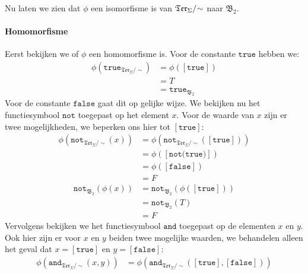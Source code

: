 \documentclass[a4paper,11pt]{article}
\begin{document}
\begin{description}
Nu laten we zien dat $\phi$ een isomorfisme is van
$\mathfrak{Ter}_{\Sigma}/\negmedspace\sim$ naar $\mathfrak{B}_{2}$.

\paragraph{Homomorfisme}

Eerst bekijken we of $\phi$ een homomorfisme is. Voor de constante
$\texttt{true}$ hebben we:
\begin{align*}
\phi(\texttt{true}_{\mathfrak{Ter}_{\Sigma}/\sim}) &= \phi([\texttt{true}]) \\
                                                   &= T \\
                                                   &= \texttt{true}_{\mathfrak{B}_{2}}
\end{align*}
Voor de constante $\texttt{false}$ gaat dit op gelijke wijze. We bekijken nu
het functiesymbool $\texttt{not}$ toegepast op het element $x$. Voor de waarde
van $x$ zijn er twee mogelijkheden, we beperken ons hier tot
$[\texttt{true}]$:
\begin{align*}
\phi(\texttt{not}_{\mathfrak{Ter}_{\Sigma}/\sim}(x)) &= \phi(\texttt{not}_{\mathfrak{Ter}_{\Sigma}/\sim}([\texttt{true}])) \\
                                                     &= \phi([\texttt{not(true)}]) \\
                                                     &= \phi([\texttt{false}]) \\
                                                     &= F
\end{align*}
\begin{align*}
\texttt{not}_{\mathfrak{B}_{2}}(\phi(x)) &= \texttt{not}_{\mathfrak{B}_{2}}(\phi([\texttt{true}])) \\
                                         &= \texttt{not}_{\mathfrak{B}_{2}}(T) \\
                                         &= F
\end{align*}
Vervolgens bekijken we het functiesymbool $\texttt{and}$ toegepast op de
elementen $x$ en $y$. Ook hier zijn er voor $x$ en $y$ beiden twee mogelijke
waarden, we behandelen alleen het geval dat $x = [\texttt{true}]$ en $y =
[\texttt{false}]$:
\begin{align*}
\phi(\texttt{and}_{\mathfrak{Ter}_{\Sigma}/\sim}(x,y)) &= \phi(\texttt{and}_{\mathfrak{Ter}_{\Sigma}/\sim}([\texttt{true}],[\texttt{false}])) \\

\end{align*}
\end{description}
\end{document}
